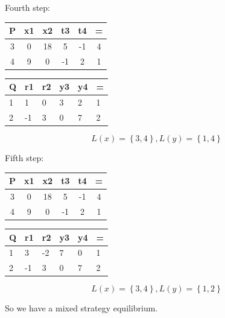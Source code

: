 \documentclass{article}
\newenvironment{answer}{\par\color{ForestGreen}}{\par}
\begin{document}
\begin{answer}
Fourth step:

\begin{table}[!htb]
\begin{answer}
\begin{minipage}[t]{.5\textwidth}
\centering
\begin{tabular}[t]{cccccc}
  \toprule
  P & x1 & x2 & t3 & t4 & = \\
  \midrule
  3 & 0 & 18 & 5 & -1 & 4 \\
  \hline
  4 & 9 & 0 & -1 & 2 & 1 \\
  \bottomrule
\end{tabular}
\end{minipage}
\begin{minipage}[t]{0.5\textwidth}
\centering
\begin{tabular}[t]{llllll}
  \toprule
  Q & r1 & r2 & y3 & y4 & = \\
  \midrule
  1 & 1 & 0 & 3 & 2 & 1 \\
  \hline
  2 & -1 & 3 & 0 & 7 & 2 \\
  \bottomrule
\end{tabular}
\end{minipage}
\end{answer}
\end{table}
$$L(x)=\left\{3,4\right\}, L(y)=\left\{1,4\right\}$$

Fifth step:

\begin{table}[!htb]
\begin{answer}
\begin{minipage}[t]{.5\textwidth}
\centering
\begin{tabular}[t]{cccccc}
  \toprule
  P & x1 & x2 & t3 & t4 & = \\
  \midrule
  3 & 0 & 18 & 5 & -1 & 4 \\
  \hline
  4 & 9 & 0 & -1 & 2 & 1 \\
  \bottomrule
\end{tabular}
\end{minipage}
\begin{minipage}[t]{0.5\textwidth}
\centering
\begin{tabular}[t]{llllll}
  \toprule
  Q & r1 & r2 & y3 & y4 & = \\
  \midrule
  1 & 3 & -2 & 7 & 0 & 1 \\
  \hline
  2 & -1 & 3 & 0 & 7 & 2 \\
  \bottomrule
\end{tabular}
\end{minipage}
\end{answer}
\end{table}
$$L(x)=\left\{3,4\right\}, L(y)=\left\{1,2\right\}$$

So we have a mixed strategy equilibrium.
\end{answer}
\end{document}
